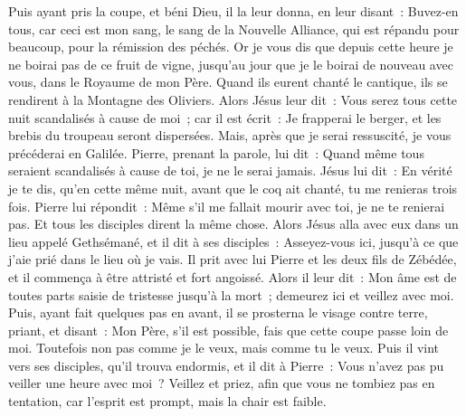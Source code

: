 \begin{multicols}{2}
Puis ayant pris la coupe, et béni Dieu, il la leur donna, en leur disant~: Buvez-en tous,
car ceci est mon sang, le sang de la Nouvelle Alliance, qui est répandu pour beaucoup, pour la rémission des péchés.
Or je vous dis que depuis cette heure je ne boirai pas de ce fruit de vigne, jusqu'au jour que je le boirai de nouveau avec vous, dans le Royaume de mon Père.
Quand ils eurent chanté le cantique, ils se rendirent à la Montagne des Oliviers.
Alors Jésus leur dit~: Vous serez tous cette nuit scandalisés à cause de moi~; car il est écrit~: Je frapperai le berger, et les brebis du troupeau seront dispersées.
Mais, après que je serai ressuscité, je vous précéderai en Galilée.
Pierre, prenant la parole, lui dit~: Quand même tous seraient scandalisés à cause de toi, je ne le serai jamais.
Jésus lui dit~: En vérité je te dis, qu'en cette même nuit, avant que le coq ait chanté, tu me renieras trois fois.
Pierre lui répondit~: Même s'il me fallait mourir avec toi, je ne te renierai pas. Et tous les disciples dirent la même chose.
Alors Jésus alla avec eux dans un lieu appelé Gethsémané, et il dit à ses disciples~: Asseyez-vous ici, jusqu'à ce que j'aie prié dans le lieu où je vais.
Il prit avec lui Pierre et les deux fils de Zébédée, et il commença à être attristé et fort angoissé.
Alors il leur dit~: Mon âme est de toutes parts saisie de tristesse jusqu'à la mort~; demeurez ici et veillez avec moi.
Puis, ayant fait quelques pas en avant, il se prosterna le visage contre terre, priant, et disant~: Mon Père, s'il est possible, fais que cette coupe passe loin de moi. Toutefois non pas comme je le veux, mais comme tu le veux.
Puis il vint vers ses disciples, qu'il trouva endormis, et il dit à Pierre~: Vous n'avez pas pu veiller une heure avec moi~?
Veillez et priez, afin que vous ne tombiez pas en tentation, car l'esprit est prompt, mais la chair est faible.

\end{multicols}
